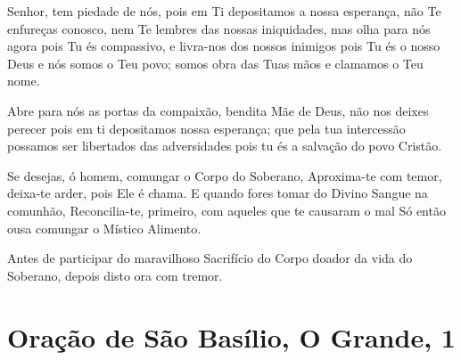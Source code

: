 \documentclass{subfiles}
\begin{document}
\doxology{}

Senhor, tem piedade de nós, pois em Ti depositamos a nossa esperança, não Te
enfureças conosco, nem Te lembres das nossas iniquidades, mas olha para nós
agora pois Tu és compassivo, e livra-nos dos nossos inimigos pois Tu és o nosso
Deus e nós somos o Teu povo; somos obra das Tuas mãos e clamamos o Teu nome.

\nowandever{}

Abre para nós as portas da compaixão, bendita Mãe de Deus, não nos
deixes perecer pois em ti depositamos nossa esperança; que pela tua
intercessão possamos ser libertados das adversidades pois tu és a salvação do
povo Cristão.

\mercy{} 



Se desejas, ó homem, comungar o Corpo do Soberano,
Aproxima-te com temor, deixa-te arder, pois Ele é chama.
E quando fores tomar do Divino Sangue na comunhão,
Reconcilia-te, primeiro, com aqueles que te causaram o mal
Só então ousa comungar o Místico Alimento.


Antes de participar do maravilhoso Sacrifício do Corpo doador da vida do
Soberano, depois disto ora com tremor.

\section*{Oração de São Basílio, O Grande, 1}
\end{document}
